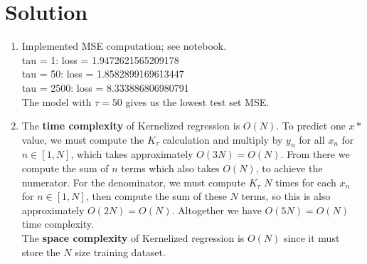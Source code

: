 \documentclass[submit]{harvardml}
\newenvironment{solution}
  {\color{blue}\section*{Solution}}
{}
\begin{document}
\begin{solution}
\begin{enumerate}
    \item Implemented MSE computation; see notebook.\\

    tau = 1: loss = 1.9472621565209178\\
tau = 50: loss = 1.8582899169613447\\
tau = 2500: loss = 8.333886806980791\\

    The model with $\tau=50$ gives us the lowest test set MSE.
    \item The \textbf{time complexity} of Kernelized regression is $O(N)$. To predict one $x*$ value, we must compute the $K_{\tau}$ calculation and multiply by $y_n$ for all $x_n$ for $n \in [1,N]$, which takes approximately $O(3N) = O(N)$. From there we compute the sum of $n$ terms which also takes $O(N)$, to achieve the numerator. For the denominator, we must compute $K_{\tau}$ $N$ times for each $x_n$ for $n \in [1,N]$, then compute the sum of these $N$ terms, so this is also approximately $O(2N) = O(N)$. Altogether we have $O(5N) = O(N)$ time complexity.\\

    The \textbf{space complexity} of Kernelized regression is $O(N)$ since it must store the $N$ size training dataset.
 \end{enumerate}
\end{solution}

\end{document}
